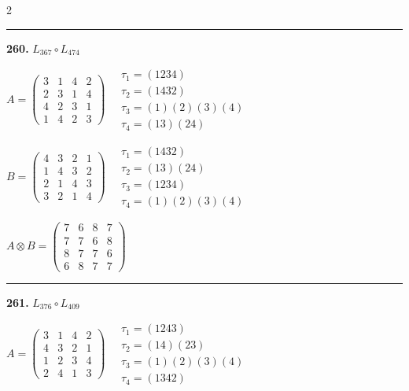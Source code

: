\begin{multicols}{2}
\vspace{0.3em}
\hrule
\vspace{0.3em}

\noindent\textbf{260.} $L_{367} \circ L_{474}$

$A = \begin{pmatrix} 3 & 1 & 4 & 2 \\ 2 & 3 & 1 & 4 \\ 4 & 2 & 3 & 1 \\ 1 & 4 & 2 & 3 \end{pmatrix} \quad \begin{matrix} \tau_{1}=(1 2 3 4) \\ \tau_{2}=(1 4 3 2) \\ \tau_{3}=(1)(2)(3)(4) \\ \tau_{4}=(1 3)(2 4) \end{matrix}$

$B = \begin{pmatrix} 4 & 3 & 2 & 1 \\ 1 & 4 & 3 & 2 \\ 2 & 1 & 4 & 3 \\ 3 & 2 & 1 & 4 \end{pmatrix} \quad \begin{matrix} \tau_{1}=(1 4 3 2) \\ \tau_{2}=(1 3)(2 4) \\ \tau_{3}=(1 2 3 4) \\ \tau_{4}=(1)(2)(3)(4) \end{matrix}$

$A \otimes B = \begin{pmatrix} 7 & 6 & 8 & 7 \\ 7 & 7 & 6 & 8 \\ 8 & 7 & 7 & 6 \\ 6 & 8 & 7 & 7 \end{pmatrix}$

\vspace{0.3em}
\hrule
\vspace{0.3em}

\noindent\textbf{261.} $L_{376} \circ L_{409}$

$A = \begin{pmatrix} 3 & 1 & 4 & 2 \\ 4 & 3 & 2 & 1 \\ 1 & 2 & 3 & 4 \\ 2 & 4 & 1 & 3 \end{pmatrix} \quad \begin{matrix} \tau_{1}=(1 2 4 3) \\ \tau_{2}=(1 4)(2 3) \\ \tau_{3}=(1)(2)(3)(4) \\ \tau_{4}=(1 3 4 2) \end{matrix}$


\end{multicols}
